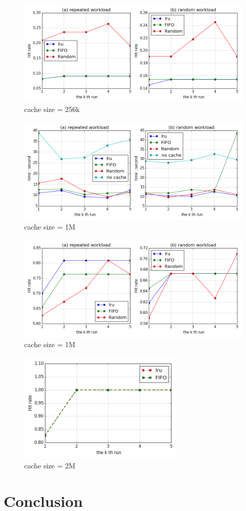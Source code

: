 \documentclass[paper=a4, fontsize=11pt]{scrartcl} %
\numberwithin{equation}{section} %
\numberwithin{figure}{section} %
\numberwithin{table}{section} %
\begin{document}
\begin{figure}[h]
  \centering
  \includegraphics[width=\textwidth]{../data/hit256k}
  \caption{cache size = 256k}
  \label{fig:hit256k}
\end{figure}
\begin{figure}[h]
  \centering
  \includegraphics[width=\textwidth]{../data/time1M}
  \caption{cache size = 1M}
  \label{fig:time1M}
\end{figure}
\begin{figure}[h]
  \centering
  \includegraphics[width=\textwidth]{../data/hit1M}
  \caption{cache size = 1M}
  \label{fig:hit1M}
\end{figure}
\begin{figure}[h]
  \centering
  \includegraphics[width=0.7\textwidth]{../data/hit2M}
  \caption{cache size = 2M}
  \label{fig:time2M}
\end{figure}

\section{Conclusion}
\end{document}
